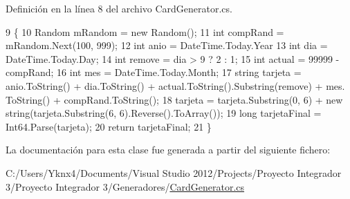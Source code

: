 Definición en la línea 8 del archivo Card\-Generator.\-cs.


\begin{DoxyCode}
9         \{
10             Random mRandom = \textcolor{keyword}{new} Random();
11             \textcolor{keywordtype}{int} compRand = mRandom.Next(100, 999);
12             \textcolor{keywordtype}{int} anio = DateTime.Today.Year %
13             \textcolor{keywordtype}{int} dia = DateTime.Today.Day;
14             \textcolor{keywordtype}{int} \textcolor{keyword}{remove} = dia > 9 ? 2 : 1;
15             \textcolor{keywordtype}{int} actual = 99999 - compRand;
16             \textcolor{keywordtype}{int} mes = DateTime.Today.Month;
17             \textcolor{keywordtype}{string} tarjeta = anio.ToString() + dia.ToString() + actual.ToString().Substring(\textcolor{keyword}{remove}) + mes.
      ToString() + compRand.ToString();
18             tarjeta = tarjeta.Substring(0, 6) + \textcolor{keyword}{new} string(tarjeta.Substring(6, 6).Reverse().ToArray());
19             \textcolor{keywordtype}{long} tarjetaFinal = Int64.Parse(tarjeta);
20             \textcolor{keywordflow}{return} tarjetaFinal;
21         \}
\end{DoxyCode}


La documentación para esta clase fue generada a partir del siguiente fichero\-:\begin{DoxyCompactItemize}
\item 
C\-:/\-Users/\-Yknx4/\-Documents/\-Visual Studio 2012/\-Projects/\-Proyecto Integrador 3/\-Proyecto Integrador 3/\-Generadores/\hyperlink{_card_generator_8cs}{Card\-Generator.\-cs}\end{DoxyCompactItemize}
